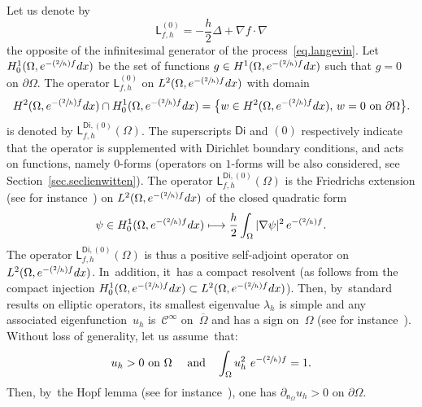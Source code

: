 \documentclass[JEP,XML,SOM,Unicode,NoEqCountersInSection,NoFloatCountersInSection,published]{cedram}
\newcommand{\Psfrac}[2]{(\sfrac{#1}{#2})}
\newcommand\mto{\mathchoice{\longmapsto}{\mapsto}{\mapsto}{\mapsto}}
\newcommand{\quand}{\quad\text{and}\quad}
\theoremstyle{plain}
\theoremstyle{definition}
\begin{document}
Let us denote by
\begin{equation}\label{eq:inf_gen}
\mathsf L_{f,h}^{(0)} =-\frac h2 \Delta+\nabla f\cdot \nabla
\end{equation}
the opposite of the infinitesimal generator of the process~\eqref{eq.langevin}.
Let $ H^1_0(\Omega, e^{-\Psfrac 2hf}dx)$ be the set of functions $g\in H^1(\Omega, e^{-\Psfrac 2hf}dx)$ such that $g=0$ on $\partial \Omega$.
The operator $ \mathsf L_{f,h}^{(0)}$ on $L^2(\Omega, e^{-\Psfrac 2h f}dx)$ with domain
\[
H^2(\Omega, e^{-\Psfrac 2h f}dx)\cap H^1_0(\Omega, e^{-\Psfrac 2h f}dx)=\big \{w\in H^2(\Omega, e^{-\Psfrac 2h f}dx), \, w=0 \text{ on } \partial \Omega \big\}.
\]
is denoted by $ \mathsf L^{\mathsf{Di},(0)}_{f,h}(\Omega)$. The
superscripts $\mathsf{Di}$ and $(0)$ respectively indicate that the
operator is supplemented with Dirichlet
boundary conditions, and acts on functions, namely $0$-forms (operators on $1$-forms will be also considered, see Section~\ref{sec.seclienwitten}).
The operator $ \mathsf L^{\mathsf{Di},(0)}_{f,h}(\Omega) $ is the Friedrichs extension (see for instance~\cite[\S4.3]{helffer2013spectral}) on $L^2(\Omega, e^{-\Psfrac 2hf}dx)$ of the closed quadratic form
\begin{equation}\label{eq.Q}
\psi \in H^1_0(\Omega, e^{-\Psfrac 2hf}dx)\mto \frac h2 \int_\Omega \vert \nabla \psi \vert^2\, e^{-\Psfrac 2hf}.
\end{equation}
The operator $ \mathsf L^{\mathsf{Di},(0)}_{f,h}(\Omega)$ is thus a
positive self-adjoint operator on $L^2(\Omega, e^{-\Psfrac 2h
f}dx)$. In~addition, it~has a compact resolvent (as follows from the compact
injection $H^1_0(\Omega, e^{-\Psfrac 2h f}dx)\subset L^2(\Omega, e^{-\Psfrac 2h f}dx)$).
Then, by~standard results on elliptic operators, its smallest eigenvalue $ \lambda_{h}$ is simple and any associated eigenfunction~$u_{h}$ is~$\mathcal C^\infty$ on~$\overline \Omega$ and has a sign on~$\Omega$ (see for instance~\cite[\S\S6.3 \&~6.5]{Eva}).
Without \label{page.lambdah}
loss of
generality, let us assume~that:
\begin{equation}\label{eq.u_norma0}
u_h > 0 \text{ on } \Omega \ \quand \int_{\Omega} u_h^2\ e^{-\Psfrac{2}{h}f} =1.
\end{equation}
Then, by~the Hopf lemma (see for instance~\cite[\S 6.4.2]{Eva}), one has $\partial_{\mathsf n_\Omega}u_h>0$ on $\partial
\Omega$.
\end{document}
